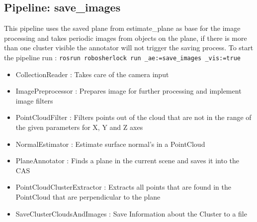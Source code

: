\documentclass[main.tex]{subfiles}
\begin{document}
			\subsection{Pipeline: save\_images}
This pipeline uses the saved plane from estimate\_plane as base for the image processing and takes periodic images from objects on the plane, if there is more than one cluster visible the annotator will not trigger the saving process. To start the pipeline run : \texttt{rosrun robosherlock run \_ae:=save\_images \_vis:=true} 
\begin{itemize}
	\item CollectionReader : Takes care of the camera input
	\item ImagePreprocessor : Prepares image for further processing and implement image filters  
	\item PointCloudFilter : Filters points out of the cloud that are not in the range of the given parameters for X, Y and Z axes
	\item NormalEstimator : Estimate surface normal's in a PointCloud 
	\item PlaneAnnotator : Finds a plane in the current scene and saves it into the CAS
	\item PointCloudClusterExtractor : Extracts all points that are found in the PointCloud that are perpendicular to the plane 
	\item SaveClusterCloudsAndImages : Save Information about the Cluster to a file 
\end{itemize}
\end{document}
